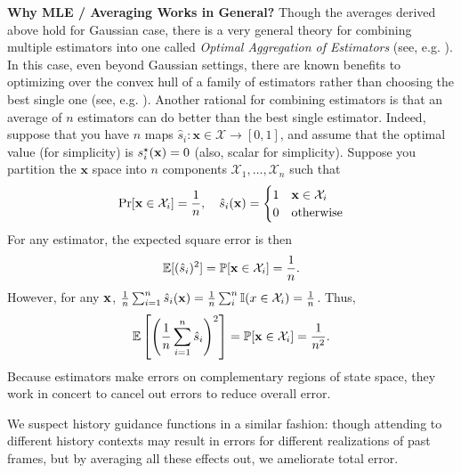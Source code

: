 \textbf{Why  MLE / Averaging Works in General?}
Though the averages derived above hold for Gaussian case, there is a very general theory for combining multiple estimators into one called \emph{Optimal Aggregation of Estimators} (see, e.g. \cite{rigollet2007linear}). In this case, even beyond Gaussian settings, there are known benefits to optimizing over the convex hull of a family of estimators rather than choosing the best single one (see, e.g. \cite{bellec2017optimal}).
Another rational for combining estimators is that an average of $n$ estimators can do better than the best single estimator. 
\newcommand{\cX}{\mathcal{X}}%
Indeed, suppose that you have $n$ maps $\hat{s}_i: \mathbf{x}  \in \cX \to [0,1]$, and assume that the optimal value (for simplicity) is $s^\star_i({\mathbf{x}}) = 0$ (also, scalar for simplicity). Suppose you partition the $\mathbf x$ space into $n$ components $\cX_1,\dots,\cX_n$ such that
\begin{align}
    \Pr[\mathbf{x} \in \cX_i] = \frac{1}{n}, \quad \hat{s}_i(\bx) = \begin{cases} 1 & \mathbf x \in \cX_i\\
    0 & \text{otherwise}
    \end{cases}
\end{align}
For any estimator, the expected square error is then 
\begin{align}
    \Exp[(\hat{s}_i)^2] = \mathbb{P}[\mathbf x \in \cX_i] = \frac{1}{n}.
\end{align}
However, for any ${\mathbf{x}}$, $\frac{1}{n}\sum_{i=1}^n\hat{s}_i(\bx) = \frac{1}{n}\sum_{i}^n \mathbb{I}(x \in \cX_i) = \frac{1}{n}$. Thus, 
\begin{align}
    \Exp\left[\left(\frac{1}{n}\sum_{i=1}^n\hat{s}_i\right)^2\right] = \mathbb{P}[\mathbf x \in \cX_i] = \frac{1}{n^2}.
\end{align}
Because estimators make errors on complementary regions of state space, they work in concert to cancel out errors to reduce overall error. 

We suspect history guidance functions in a similar fashion: though attending to different history contexts may result in errors for different realizations of past frames, but by averaging all these effects out, we ameliorate total error. 








